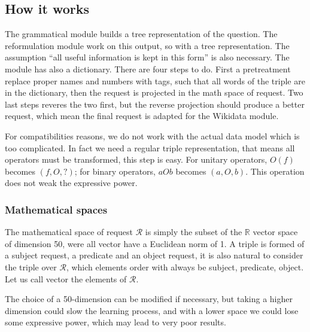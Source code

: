 \subsection{How it works}


The grammatical module builds a tree representation of the question. The reformulation module work on this output, so with a tree representation. The assumption ``all useful information is kept in this form''  is also necessary. The module has also a dictionary. There are four steps to do. First a pretreatment replace proper names and numbers with tags, such that all words of the triple are in the dictionary, then the request is projected in the math space of request. Two last steps reveres the two first, but the reverse projection should produce a better request, which mean the final request is adapted for the Wikidata module.

For compatibilities reasons, we do not work with the actual data model which is too complicated. In fact we need a regular triple representation, that means all operators must be transformed, this step is easy. For unitary operators, $O(f)$ becomes $(f,O,?)$; for binary operators, $aOb$ becomes $(a,O,b)$. This operation does not weak the expressive power.

\subsubsection{Mathematical spaces}

The mathematical space of request $\mathcal{R}$ is simply the subset of the $\mathbb{R}$ vector space of dimension 50, were all vector have a Euclidean norm of 1.
A triple is formed of a subject request, a predicate and an object request, it is also natural to consider the triple over $\mathcal{R}$, which elements order with always be subject, predicate, object.
Let us call vector the elements of $\mathcal{R}$.

The choice of a 50-dimension can be modified if necessary, but taking a higher dimension could slow the learning process, and with a lower space we could lose some expressive power, which may lead to very poor results.



